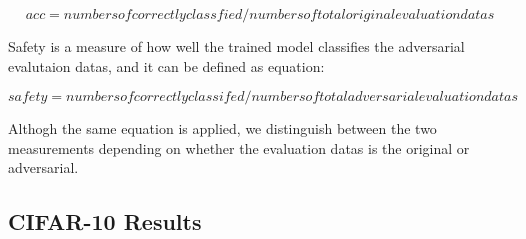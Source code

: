 \documentclass[journal,article,submit,moreauthors,pdftex]{Definitions/mdpi}
\begin{document}
\begin{equation}
    acc = numbers of correctly classfied / numbers of total original evaluation datas
\end{equation}

Safety is a measure of how well the trained model classifies the adversarial evalutaion datas, and it can be defined as equation:

\begin{equation}
    safety = numbers of correctly classifed / numbers of total adversarial evaluation datas
\end{equation}

Althogh the same equation is applied, we distinguish between the two measurements depending on whether the evaluation datas is the original or adversarial.

\subsection{CIFAR-10 Results}
\end{document}
